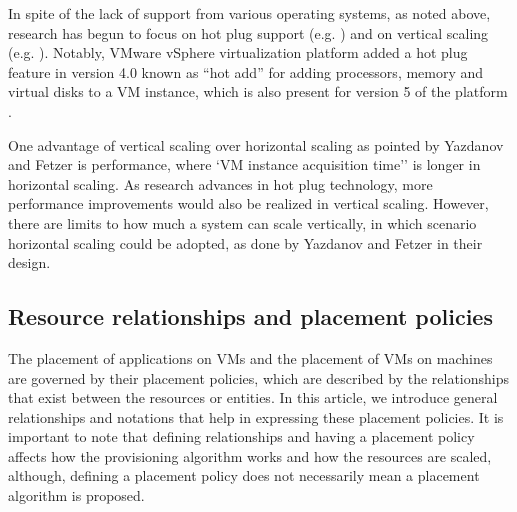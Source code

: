 \documentclass[10pt,journal,cspaper,compsoc]{IEEEtran}
\begin{document}
In spite of the lack of support from various operating systems, as noted above, research has begun to focus on hot plug support (e.g. \cite{2010_DynamicProcDynamicOS, 2012_ChameleonOSDynamicProcs}) and on vertical scaling (e.g. \cite{2012_VerticalScaling}). Notably, VMware vSphere virtualization platform \cite{2014_VMwareVSphere} added a hot plug feature in version 4.0 known as ``hot add'' \cite{2009_VSphere4_HotAdd} for adding processors, memory and virtual disks to a VM instance, which is also present for version 5 of the platform \cite{2011_WhitePaper_VMwareVSphereCompRev}.

One advantage of vertical scaling over horizontal scaling as pointed by Yazdanov and Fetzer \cite{2012_VerticalScaling} is performance, where `VM instance acquisition time'' \cite{2012_VerticalScaling} is longer in horizontal scaling. As research advances in hot plug technology, more performance improvements would also be realized in vertical scaling. However, there are limits to how much a system can scale vertically, in which scenario horizontal scaling could be adopted, as done by Yazdanov and Fetzer \cite{2012_VerticalScaling} in their design.

\subsection{Resource relationships and placement policies}
\label{subsec:PlacPolicies}
The placement of applications on VMs and the placement of VMs on machines are governed by their placement policies, which are described by the relationships that exist between the resources or entities. In this article, we introduce general relationships and notations that help in expressing these placement policies. It is important to note that defining relationships and having a placement policy affects how the provisioning algorithm works and how the resources are scaled, although, defining a placement policy does not necessarily mean a placement algorithm is proposed.
\end{document}
